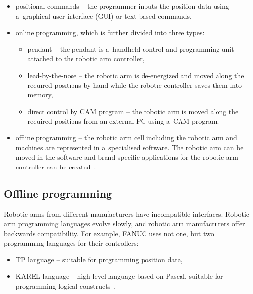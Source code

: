 \begin{itemize}
    \item positional commands -- the programmer inputs the position data using a~graphical user interface (GUI) or text-based commands,
    
    \item online programming, which is further divided into three types:
    
    \begin{itemize}
    
    \item pendant -- the pendant is a~handheld control and programming unit attached to the robotic arm controller,
    \item lead-by-the-nose -- the robotic arm is de-energized and moved along the required positions by hand while the robotic controller saves them into memory,
    \item direct control by CAM program -- the robotic arm is moved along the required positions from an external PC using a~CAM program.
    
    \end{itemize}
    
    \item offline programming -- the robotic arm cell including the robotic arm and machines are represented in a~specialised software. The robotic arm can be moved in the software and brand-specific applications for the robotic arm controller can be created~\cite{robodkmethods}.
  

\end{itemize}

\subsection{Offline programming}
Robotic arms from different manufacturers have incompatible interfaces. Robotic arm programming languages evolve slowly, and robotic arm manufacturers offer backwards compatibility. For example, FANUC uses not one, but two programming languages for their controllers: 

\begin{itemize}

 \item TP language -- suitable for programming position data,
 \item KAREL language -- high-level language based on Pascal, suitable for programming logical constructs~\cite{fanuchandling}.

\end{itemize}

